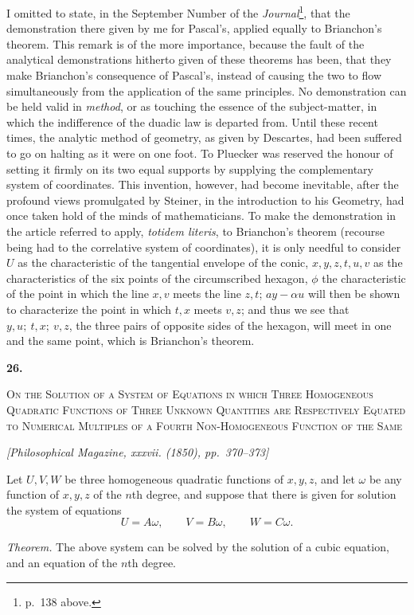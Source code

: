 \documentclass[11pt]{article}
\newcommand{\paperhead}[3]{%
  \clearpage
  \begin{center}
  {\Large\bfseries #1.}\par\vspace{0.85em}
  {\large\scshape #2}\par\vspace{0.6em}
  {\itshape [#3]}\par
  \end{center}\vspace{0.4em}}
\newcommand{\sourcepage}[1]{\marginpar{\scriptsize p.~#1}}
\begin{document}
{{\sourcepage{151}
I omitted to state, in the September Number of the \emph{Journal}\footnote{p.~138 above.}, that the demonstration there given by me for Pascal's, applied equally to Brianchon's theorem. This remark is of the more importance, because the fault of the analytical demonstrations hitherto given of these theorems has been, that they make Brianchon's consequence of Pascal's, instead of causing the two to flow simultaneously from the application of the same principles. No demonstration can be held valid in \emph{method}, or as touching the essence of the subject-matter, in which the indifference of the duadic law is departed from. Until these recent times, the analytic method of geometry, as given by Descartes, had been suffered to go on halting as it were on one foot. To Pluecker was reserved the honour of setting it firmly on its two equal supports by supplying the complementary system of coordinates. This invention, however, had become inevitable, after the profound views promulgated by Steiner, in the introduction to his Geometry, had once taken hold of the minds of mathematicians. To make the demonstration in the article referred to apply, \emph{totidem literis}, to Brianchon's theorem (recourse being had to the correlative system of coordinates), it is only needful to consider $U$ as the characteristic of the tangential envelope of the conic, $x,y,z,t,u,v$ as the characteristics of the six points of the circumscribed hexagon, $\phi$ the characteristic of the point in which the line $x,v$ meets the line $z,t$; $ay-\alpha u$ will then be shown to characterize the point in which $t,x$ meets $v,z$; and thus we see that $y,u;\ t,x;\ v,z$, the three pairs of opposite sides of the hexagon, will meet in one and the same point, which is Brianchon's theorem.

\paperhead{26}{On the Solution of a System of Equations in which Three Homogeneous Quadratic Functions of Three Unknown Quantities are Respectively Equated to Numerical Multiples of a Fourth Non-Homogeneous Function of the Same}{Philosophical Magazine, xxxvii. (1850), pp.~370--373}

\sourcepage{152}
Let $U,V,W$ be three homogeneous quadratic functions of $x,y,z$, and let $\omega$ be any function of $x,y,z$ of the $n$th degree, and suppose that there is given for solution the system of equations
\[
 U=A\omega,\qquad V=B\omega,\qquad W=C\omega.
\]

\emph{Theorem.} The above system can be solved by the solution of a cubic equation, and an equation of the $n$th degree.

}}
\end{document}
